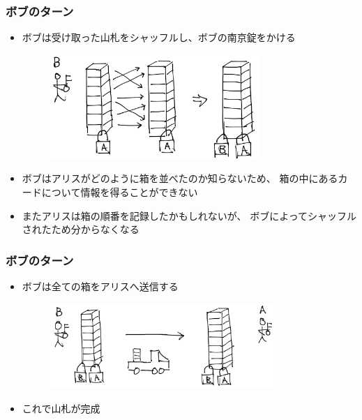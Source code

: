 
\begin{frame}
  \frametitle{\showIndex ボブのターン}

  \begin{itemize}
    \item<+-> ボブは受け取った山札をシャッフルし、ボブの南京錠をかける
    \begin{figure}[h]
      \includegraphics[width=0.75\textwidth]{img/shuffle_deck.png}
    \end{figure}

    \item<+-> ボブはアリスがどのように箱を並べたのか知らないため、
    箱の中にあるカードについて情報を得ることができない

    \item<+-> またアリスは箱の順番を記録したかもしれないが、
    ボブによってシャッフルされたため分からなくなる
  \end{itemize}
\end{frame}


\begin{frame}
  \frametitle{\showIndex ボブのターン}

  \begin{itemize}
    \item<+-> ボブは全ての箱をアリスへ送信する
    \begin{figure}[h]
      \includegraphics[width=0.8\textwidth]{img/send_to_a.png}
    \end{figure}

    \item<+-> これで山札が完成
  \end{itemize}
\end{frame}

